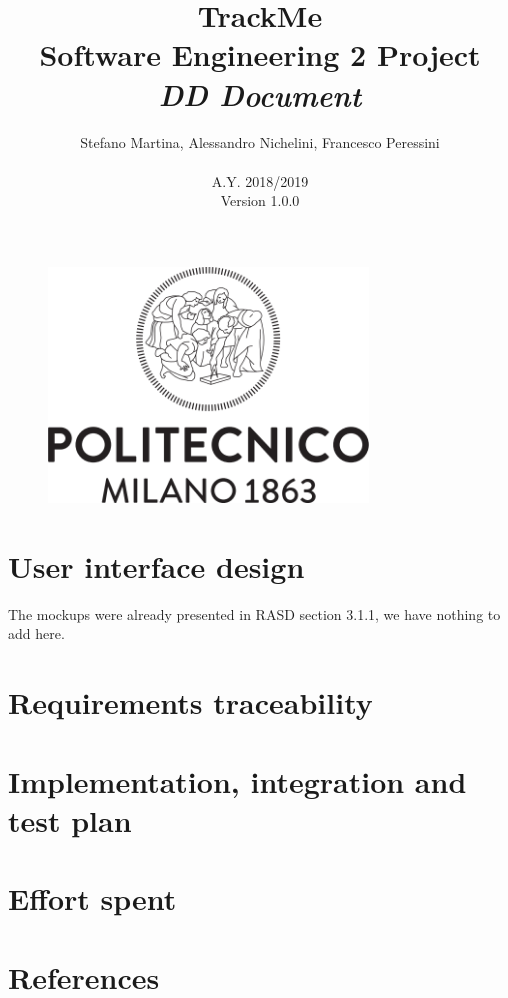\documentclass{article}
\begin{document}
	\begin{figure}[t]
	\centering
	\includegraphics[height=6.25cm,keepaspectratio]{Figures/logo}
	\end{figure}
	
	\title{TrackMe \\ Software Engineering 2 Project \\ 
			\textit{DD Document} }
	\author{Stefano Martina, Alessandro Nichelini, Francesco Peressini
		\\ \\ A.Y. 2018/2019 \\ Version 1.0.0}
		
\maketitle
\newpage

\tableofcontents

\newpage






\section{User interface design}
The mockups were already presented in RASD section 3.1.1, we have nothing to add here.
\section{Requirements traceability}

\section{Implementation, integration and test plan}
 
\section{Effort spent}

\section{References}
\newpage


 
\end{document}
